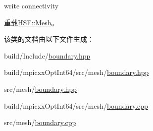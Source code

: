 write connectivity 

重载\hyperlink{classHSF_1_1Mesh_a2cd3b5d0f1dcf97d7b4cb565b32bcaf8}{HSF::Mesh}。

该类的文档由以下文件生成：\begin{DoxyCompactItemize}
\item 
build/Include/\hyperlink{build_2Include_2boundary_8hpp}{boundary.hpp}\item 
build/mpicxxOptInt64/src/mesh/\hyperlink{build_2mpicxxOptInt64_2src_2mesh_2boundary_8hpp}{boundary.hpp}\item 
src/mesh/\hyperlink{src_2mesh_2boundary_8hpp}{boundary.hpp}\item 
build/mpicxxOptInt64/src/mesh/\hyperlink{build_2mpicxxOptInt64_2src_2mesh_2boundary_8cpp}{boundary.cpp}\item 
src/mesh/\hyperlink{src_2mesh_2boundary_8cpp}{boundary.cpp}\end{DoxyCompactItemize}
